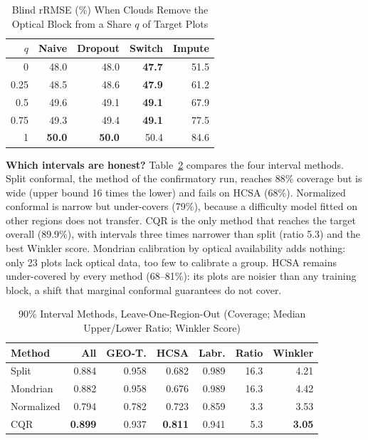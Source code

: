 \documentclass[conference,a4paper]{IEEEtran}
\begin{document}
\begin{table}[t]
\centering
\caption{Blind rRMSE (\%) When Clouds Remove the Optical Block from a Share $q$ of Target Plots}
\label{tab:cloudrob}
\footnotesize
\setlength{\tabcolsep}{4pt}
\begin{tabular}{@{}r r r r r@{}}
\toprule
$q$ & \textbf{Naive} & \textbf{Dropout} & \textbf{Switch} & \textbf{Impute}\\
\midrule
0 & 48.0 & 48.0 & \textbf{47.7} & 51.5\\
0.25 & 48.5 & 48.6 & \textbf{47.9} & 61.2\\
0.5 & 49.6 & 49.1 & \textbf{49.1} & 67.9\\
0.75 & 49.3 & 49.4 & \textbf{49.1} & 77.5\\
1 & \textbf{50.0} & \textbf{50.0} & 50.4 & 84.6\\
\bottomrule
\end{tabular}
\end{table}

\textbf{Which intervals are honest?} Table~\ref{tab:intervals} compares the four interval methods. Split conformal, the method of the confirmatory run, reaches 88\% coverage but is wide (upper bound 16 times the lower) and fails on HCSA (68\%). Normalized conformal is narrow but under-covers (79\%), because a difficulty model fitted on other regions does not transfer. CQR is the only method that reaches the target overall (89.9\%), with intervals three times narrower than split (ratio 5.3) and the best Winkler score. Mondrian calibration by optical availability adds nothing: only 23 plots lack optical data, too few to calibrate a group. HCSA remains under-covered by every method (68--81\%): its plots are noisier than any training block, a shift that marginal conformal guarantees do not cover.

\begin{table}[t]
\centering
\caption{90\% Interval Methods, Leave-One-Region-Out (Coverage; Median Upper/Lower Ratio; Winkler Score)}
\label{tab:intervals}
\footnotesize
\setlength{\tabcolsep}{3pt}
\begin{tabular}{@{}l r r r r r r@{}}
\toprule
\textbf{Method} & \textbf{All} & \textbf{GEO-T.} & \textbf{HCSA} & \textbf{Labr.} & \textbf{Ratio} & \textbf{Winkler}\\
\midrule
Split & 0.884 & 0.958 & 0.682 & 0.989 & 16.3 & 4.21\\
Mondrian & 0.882 & 0.958 & 0.676 & 0.989 & 16.3 & 4.42\\
Normalized & 0.794 & 0.782 & 0.723 & 0.859 & 3.3 & 3.53\\
CQR & \textbf{0.899} & 0.937 & \textbf{0.811} & 0.941 & 5.3 & \textbf{3.05}\\
\bottomrule
\end{tabular}
\end{table}
\end{document}
